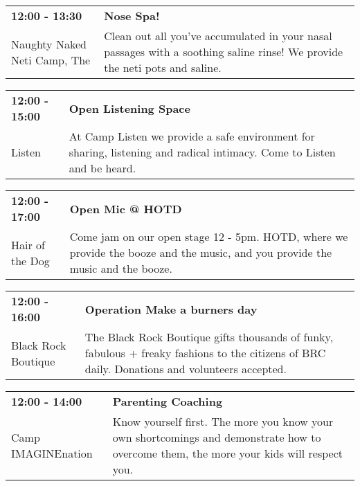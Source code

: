 \begin{tabular}{ p{1in} p{2.2in} }
    \textbf{12:00 - 13:30} & \textbf{Nose Spa! } \\
    Naughty Naked Neti Camp, The \newline  & Clean out all you've accumulated in your nasal passages with a soothing saline rinse! We provide the neti pots and saline. \\
    \hline 
\end{tabular}
    
\begin{tabular}{ p{1in} p{2.2in} }
    \textbf{12:00 - 15:00} & \textbf{Open Listening Space} \\
    Listen \newline  & At Camp Listen we provide a safe environment for sharing, listening and radical intimacy. Come to Listen and be heard. \\
    \hline 
\end{tabular}
    
\begin{tabular}{ p{1in} p{2.2in} }
    \textbf{12:00 - 17:00} & \textbf{Open Mic @ HOTD} \\
    Hair of the Dog \newline  & Come jam on our open stage 12 - 5pm. HOTD, where we provide the booze and the music, and you provide the music and the booze. \\
    \hline 
\end{tabular}
    
\begin{tabular}{ p{1in} p{2.2in} }
    \textbf{12:00 - 16:00} & \textbf{Operation Make a burners day} \\
    Black Rock Boutique \newline  & The Black Rock Boutique gifts thousands of funky, fabulous + freaky fashions to the citizens of BRC daily.  Donations and volunteers accepted. \\
    \hline 
\end{tabular}
    
\begin{tabular}{ p{1in} p{2.2in} }
    \textbf{12:00 - 14:00} & \textbf{Parenting Coaching} \\
    Camp IMAGINEnation \newline  & Know yourself first. The more you know your own shortcomings and demonstrate how to overcome them, the more your kids will respect you. \\
    \hline 
\end{tabular}
    
